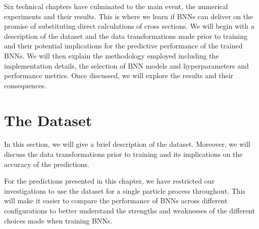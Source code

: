 Six technical chapters have culminated to the main event, the numerical experiments and their results. This is where we learn if BNNs can deliver on the promise of substituting direct calculations of cross sections. We will begin with a description of the dataset and the data transformations made prior to training and their potential implications for the predictive performance of the trained BNNs. We will then explain the methodology employed including the implementation details, the selection of BNN models and hyperparameters and performance metrics. Once discussed, we will explore the results and their consequences.



\section{The Dataset}\label{sec:dataset}
In this section, we will give a brief description of the dataset. Moreover, we will discuss the data transformations prior to training and its implications on the accuracy of the predictions.

For the predictions presented in this chapter, we have restricted our investigations to use the dataset for a single particle process throughout. This will make it easier to compare the performance of BNNs across different configurations to better understand the strengths and weaknesses of the different choices made when training BNNs. 


